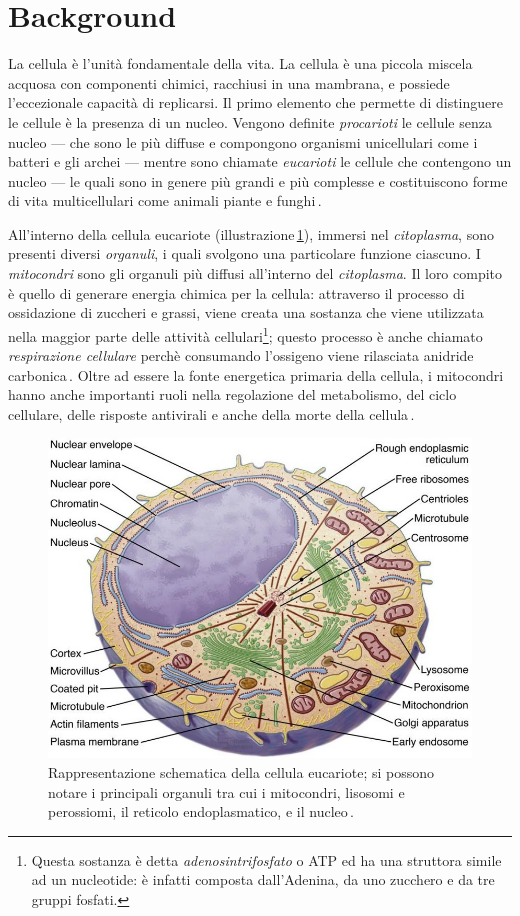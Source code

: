 \section{Background}

La cellula è l'unità fondamentale della vita. La cellula è una piccola miscela acquosa con componenti chimici, racchiusi in una mambrana, e possiede l'eccezionale capacità di replicarsi. Il primo elemento che permette di distinguere le cellule è la presenza di un nucleo. Vengono definite \textsl{procarioti} le cellule senza nucleo — che sono le più diffuse e compongono organismi unicellulari come i batteri e gli archei — mentre sono chiamate \textsl{eucarioti} le cellule che contengono un nucleo — le quali sono in genere più grandi e più complesse e costituiscono forme di vita multicellulari come animali piante e funghi\,\cite{alberts2015essential}.

All'interno della cellula eucariote (illustrazione\,\ref{fig:cell}), immersi nel \textsl{citoplasma}, sono presenti diversi \textsl{organuli}, i quali svolgono una particolare funzione ciascuno. I \textsl{mitocondri} sono gli organuli più diffusi all'interno del \textsl{citoplasma}. Il loro compito è quello di generare energia chimica per la cellula: attraverso il processo di ossidazione di zuccheri e grassi, viene creata una sostanza che viene utilizzata nella maggior parte delle attività cellulari\footnote{Questa sostanza è detta \textsl{adenosintrifosfato} o ATP ed ha una struttora simile ad un nucleotide: è infatti composta dall'Adenina, da uno zucchero e da tre gruppi fosfati.}; questo processo è anche chiamato \textsl{respirazione cellulare} perchè consumando l'ossigeno viene rilasciata anidride carbonica\,\cite{alberts2015essential, chinnery2003mitochondria}. Oltre ad essere la fonte energetica primaria della cellula, i mitocondri hanno anche importanti ruoli nella regolazione del metabolismo, del ciclo cellulare, delle risposte antivirali e anche della morte della cellula\,\cite{mcbride2006mitochondria}.

\begin{figure}[b!]
    \centering
    \includegraphics[width=.65\textwidth]{assets/cell.jpg}
    \caption[Rappresentazione schematica della cellula eucariote.]{Rappresentazione schematica della cellula eucariote; si possono notare i principali organuli tra cui i mitocondri, lisosomi e perossiomi, il reticolo endoplasmatico, e il nucleo\,\cite{pollard2022cell}.}\label{fig:cell}
\end{figure}

